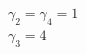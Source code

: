 \documentclass[preview]{standalone}
\begin{document}
\begin{center}
$\gamma_2 = \gamma_4 = 1$\\$\gamma_3 = 4$
\end{center}
\end{document}

